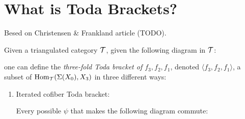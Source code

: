 \section{What is Toda Brackets?}

Besed on Christensen \& Frankland article (TODO).

\begin{definition}
    Given a triangulated category \( {\mathcal{T}} \), given the following diagram in \( {\mathcal{T}} \):

    \begin{center}
    \end{center}

    one can define the \emph{three-fold Toda bracket of \( f_3, f_2, f_1 \)}, denoted \( \langle f_3, f_2, f_1 \rangle \), a subset of \( \operatorname{Hom}_{{\mathcal{T}}}(\Sigma(X_0), X_3) \) in three different ways: \sloppy

    \begin{enumerate}
        \item {
            Iterated cofiber Toda bracket:

            Every possible \( \psi \) that makes the following diagram commute:

            \begin{center}
            \end{center}

}
\end{enumerate}
\end{definition}
